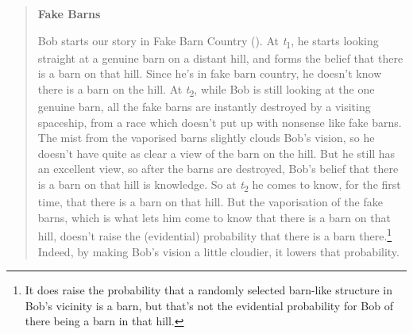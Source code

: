 \documentclass[
  10pt,
  letterpaper,
  DIV=11,
  numbers=noendperiod,
  twoside]{scrartcl}
\begin{document}
\begin{quote}
\textbf{Fake Barns}

Bob starts our story in Fake Barn Country
(). At
\emph{t}\textsubscript{1}, he starts looking straight at a genuine barn
on a distant hill, and forms the belief that there is a barn on that
hill. Since he's in fake barn country, he doesn't know there is a barn
on the hill. At \emph{t}\textsubscript{2}, while Bob is still looking at
the one genuine barn, all the fake barns are instantly destroyed by a
visiting spaceship, from a race which doesn't put up with nonsense like
fake barns. The mist from the vaporised barns slightly clouds Bob's
vision, so he doesn't have quite as clear a view of the barn on the
hill. But he still has an excellent view, so after the barns are
destroyed, Bob's belief that there is a barn on that hill is knowledge.
So at \emph{t}\textsubscript{2} he comes to know, for the first time,
that there is a barn on that hill. But the vaporisation of the fake
barns, which is what lets him come to know that there is a barn on that
hill, doesn't raise the (evidential) probability that there is a barn
there.\footnote{It does raise the probability that a randomly selected
  barn-like structure in Bob's vicinity is a barn, but that's not the
  evidential probability for Bob of there being a barn in that hill.}
Indeed, by making Bob's vision a little cloudier, it lowers that
probability.
\end{quote}
\end{document}
